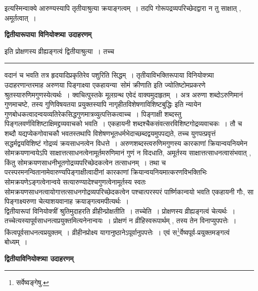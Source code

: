 \documentclass[11pt, openany]{book}
\makeatletter
\def\blfootnote{\gdef\@thefnmark{}\@footnotetext}
\makeatother
\begin{document}
{ इत्यस्मिन्वाक्ये आरुण्यस्यापि तृतीयाश्रुत्या क्रयाङ्गत्वम्~। तदपि गोरूपद्रव्यपरिच्छेदद्वारा न तु साक्षात् , अमूर्तत्वात्~।}
\begin{center}
\textbf{द्वितीयारूपाया विनियोक्त्र्या उदाहरणम्}
\end{center}

{ इति प्रोक्षणस्य व्रीह्यङ्गत्वं द्वितीयाश्रुत्या~। तच्च}\\
\hrule
\vspace{3mm}
\noindent
वदानं च भवति तत्र हृदयादिप्रकृतिरेव पशुरिति सिद्धम्~। तृतीयाविभक्तिरूपाया विनियोक्त्र्या उदाहरणान्तरमाह {\qt अरुणया पिङ्गाक्ष्या एकहायन्या\blfootnote{पाठा०\textemdash\ $^{१}$गवा.}\footnotemark\ सोमं क्रीणाति} इति ज्योतिष्टोमप्रकरणे श्रुतस्यारुणिमगुणस्येत्यर्थः~। क्वचित्पुस्तके मूलग्रन्थ एवेदं वाक्यमुदाहृतम्~। अत्र {\qt अरुणा} शब्दोऽरुणिमानं गुणमाचष्टे, तस्य गुणिविषयतया प्रयुक्तस्यापि {\qt नागृहीतविशेषणाविशिष्टबुद्धिः} इति न्यायेन गुणबोधकत्वादन्वयव्यतिरेकसिद्धगुणमात्रव्युत्पत्तिकत्वाच्च~। {\qt पिङ्गाक्षी} शब्दस्तु पिङ्गलवर्णविशिष्टाक्षिमद्द्रव्यवाचको भवति~। {\qt एकहायनी} शब्दश्चैकसंवत्सरविशिष्टगोद्रव्यवाचकः~। तौ च शब्दौ यद्यप्येकगोवाचकौ भवतस्तथापि विशेषणभूतधर्मभेदाच्छब्दद्वयमुपपद्यते, तच्च युगपत्प्रवृत्तं सद्धर्मद्वयविशिष्टं गोद्रव्यं क्रयसाधनत्वेन विधत्ते~। अरुणशब्दस्त्वरुणिमगुणस्य कारकाणां क्रियान्वयनियमेन सोमक्रयणान्वयेऽपि साक्षात्तत्साधनत्वेनामूर्तमरुणिमानं गुणं न विदधाति, अमूर्तस्य
साक्षात्तत्साधनत्वासंभवात् , किंतु सोमक्रयणसाधनीभूतगोद्रव्यपरिच्छेदकत्वेन तत्साधनम्~। तथा च परस्परमनन्वितानामेवारुण्यपिङ्गाक्षीत्वादीनां कारकाणां क्रियान्वयनियमात्करणविभक्तिभिः सोमक्रयणेऽङ्गत्वेनान्वये सत्यारुण्यादेश्चगुणत्वेनामूर्तस्य स्वतः सोमक्रयणसाधनत्वायोगात्तत्साधनगोद्रव्यपरिच्छेदकत्वेन पश्चात्परस्परं
पार्ष्णिकान्वयो भवति एकहायनी गौः, सा पिङ्गाक्ष्यरुणा चेत्याशयवानाह क्रयाङ्गत्वमपीत्यर्थः~।\\

 द्वितीयारूपां विनियोक्त्रीं श्रुतिमुदाहरति {\br व्रीहीन्प्रोक्षतीति~।  तच्चेति~।}  प्रोक्षणस्य व्रीह्यङ्गत्वं चेत्यर्थः~। तच्चेत्यस्यापूर्वसाधनत्वप्रयुक्तमित्यनेनान्वयः~।
\newpage
\fancyhead[RE]{[द्वि०विनि०उदा०]}
{\bl\noindent प्रोक्षणं न व्रीहिस्वरूपार्थम् , तस्य तेन विनाप्युपपत्तेः~। किंत्वपूर्वसाधनत्वप्रयुक्तम्~। व्रीहीनप्रोक्ष्य यागानुष्ठानेऽपू\blfootnote{पाठा०\textemdash\ $^{१}$अपूर्वानुत्पत्तेः.}\footnotemark र्वानुपपत्तेः~। एवं स\footnote{सर्वेष्वङ्गेषु.}र्वेष्वपूर्व-प्रयुक्तमङ्गत्वं बोध्यम्~।}
\begin{center}
 \textbf{द्वितीयाविनियोक्त्र्या उदाहरणम्}   
\end{center}
 
\end{document}
